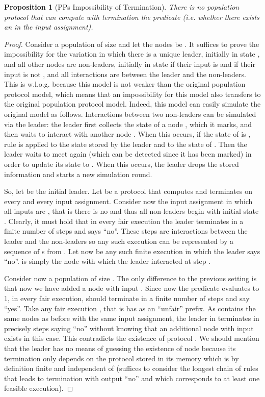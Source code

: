 \documentclass[preprint]{elsarticle}
\newtheorem{proposition}{Proposition}
\begin{document}
\begin{proposition} [PPs Impossibility of Termination] \label{pro:pp-termination-impossibility}
There is no population protocol that can compute with termination the predicate  (i.e. whether there exists an  in the input assignment).
\end{proposition}
\begin{proof}
Consider a population of size  and let the nodes be . It suffices to prove the impossibility for the variation in which there is a unique leader, initially in state , and all other nodes are non-leaders, initially in state  if their input is  and  if their input is not , and all interactions are between the leader and the non-leaders. This is w.l.o.g. because this model is not weaker than the original population protocol model, which means that an impossibility for this model also transfers to the original population protocol model. Indeed, this model can easily simulate the original model as follows. Interactions between two non-leaders can be simulated via the leader: the leader first collects the state  of a node , which it marks, and then waits to interact with another node . When this occurs, if the state of  is , rule  is applied to the state stored by the leader and to the state of . Then the leader waits to meet  again (which can be detected since it has been marked) in order to update its state to . When this occurs, the leader drops the stored information and starts a new simulation round.

So, let  be the initial leader. Let  be a protocol that computes  and terminates on every  and every input assignment. Consider now the input assignment in which all inputs are , that is there is no  and thus all non-leaders begin with initial state . Clearly, it must hold that in every fair execution the leader terminates in a finite number of steps and says ``no''. These steps are interactions between the leader and the non-leaders so any such execution can be represented by a sequence of s from . Let now  be any such finite execution in which the leader says ``no''.  is simply the node with which the leader interacted at step .

Consider now a population of size . The only difference to the previous setting is that now we have added a node  with input . Since now the predicate evaluates to 1, in every fair execution,  should terminate in a finite number of steps and say ``yes''. Take any fair execution , that is  has  as an ``unfair'' prefix. As  contains the same nodes as before with the same input assignment, the leader in  terminates in precisely  steps saying ``no'' without knowing that an additional node with input  exists in this case. This contradicts the existence of protocol . We should mention that the leader has no means of guessing the existence of node  because its termination only depends on the protocol stored in its memory which is by definition finite and independent of  (suffices to consider the longest chain of rules that leads to termination with output ``no'' and which corresponds to at least one feasible execution).
\end{proof}
\end{document}
